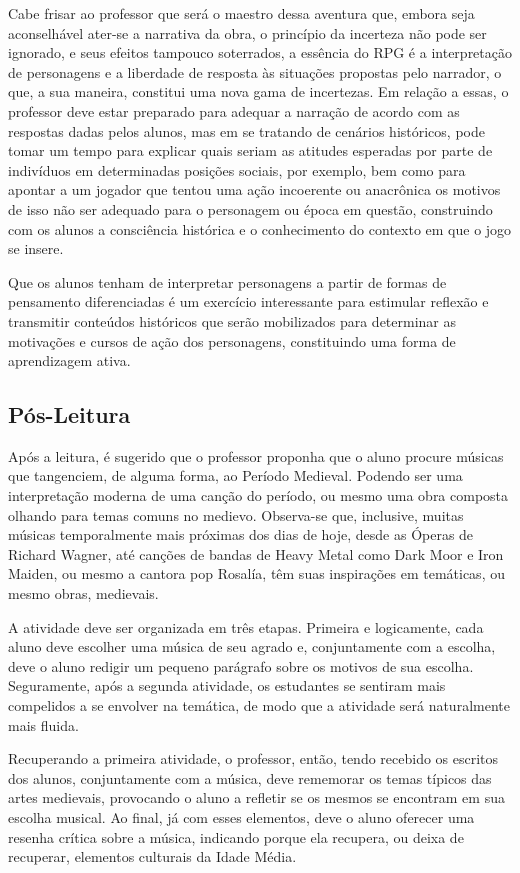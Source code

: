 \documentclass[12pt]{extarticle}
\begin{document}
Cabe frisar ao professor que será o maestro dessa aventura que, embora
seja aconselhável ater-se a narrativa da obra, o princípio da incerteza
não pode ser ignorado, e seus efeitos tampouco soterrados, a essência do
RPG é a interpretação de personagens e a liberdade de resposta às
situações propostas pelo narrador, o que, a sua maneira, constitui uma
nova gama de incertezas. Em relação a essas, o professor deve estar
preparado para adequar a narração de acordo com as respostas dadas pelos
alunos, mas em se tratando de cenários históricos, pode tomar um tempo
para explicar quais seriam as atitudes esperadas por parte de indivíduos
em determinadas posições sociais, por exemplo, bem como para apontar a
um jogador que tentou uma ação incoerente ou anacrônica os motivos de
isso não ser adequado para o personagem ou época em questão, construindo
com os alunos a consciência histórica e o conhecimento do contexto em
que o jogo se insere.

Que os alunos tenham de interpretar personagens a partir de formas de
pensamento diferenciadas é um exercício interessante para estimular
reflexão e transmitir conteúdos históricos que serão mobilizados para
determinar as motivações e cursos de ação dos personagens, constituindo
uma forma de aprendizagem ativa.

\subsection{Pós-Leitura}

Após a leitura, é sugerido que o professor proponha que o
aluno procure músicas que tangenciem, de alguma forma, ao Período
Medieval. Podendo ser uma interpretação moderna de uma canção do
período, ou mesmo uma obra composta olhando para temas comuns no
medievo. Observa-se que, inclusive, muitas músicas temporalmente mais
próximas dos dias de hoje, desde as Óperas de Richard Wagner, até
canções de bandas de Heavy Metal como Dark Moor e Iron Maiden, ou mesmo
a cantora pop Rosalía, têm suas inspirações em temáticas, ou mesmo
obras, medievais.

A atividade deve ser organizada em três etapas. Primeira e logicamente,
cada aluno deve escolher uma música de seu agrado e, conjuntamente com a
escolha, deve o aluno redigir um pequeno parágrafo sobre os motivos de
sua escolha. Seguramente, após a segunda atividade, os estudantes se
sentiram mais compelidos a se envolver na temática, de modo que a
atividade será naturalmente mais fluida.

Recuperando a primeira atividade, o professor, então, tendo recebido os
escritos dos alunos, conjuntamente com a música, deve rememorar os temas
típicos das artes medievais, provocando o aluno a refletir se os mesmos
se encontram em sua escolha musical. Ao final, já com esses elementos,
deve o aluno oferecer uma resenha crítica sobre a música, indicando
porque ela recupera, ou deixa de recuperar, elementos culturais da Idade
Média.
\end{document}
